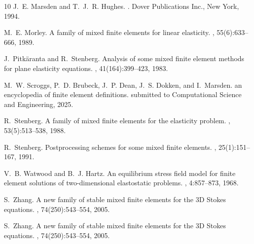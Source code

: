 \documentclass[12pt]{amsart}
\numberwithin{equation}{section}
\theoremstyle{definition}
\theoremstyle{remark}
\renewcommand{\(}{\bigl(}
\renewcommand{\)}{\bigr)}
\begin{document}
\begin{thebibliography}{10}
J.~E. Marsden and T.~J.~R. Hughes.
.
\newblock Dover Publications Inc., New York, 1994.

M.~E. Morley.
\newblock A family of mixed finite elements for linear elasticity.
, 55(6):633--666, 1989.

J.~Pitk{\"a}ranta and R.~Stenberg.
\newblock Analysis of some mixed finite element methods for plane elasticity
  equations.
, 41(164):399--423, 1983.

M.~W. Scroggs, P.~D. Brubeck, J.~P. Dean, J.~S. Dokken, and I.~Marsden.
 an encyclopedia of finite element definitions.
\newblock submitted to Computational Science and Engineering, 2025.

R.~Stenberg.
\newblock A family of mixed finite elements for the elasticity problem.
, 53(5):513--538, 1988.

R.~Stenberg.
\newblock Postprocessing schemes for some mixed finite elements.
, 25(1):151--167, 1991.

V.~B. Watwood and B.~J. Hartz.
\newblock An equilibrium stress field model for finite element solutions of
  two-dimensional elastostatic problems.
, 4:857--873,
  1968.

S.~Zhang.
\newblock A new family of stable mixed finite elements for the 3{D} {S}tokes
  equations.
, 74(250):543--554, 2005.

S.~Zhang.
\newblock A new family of stable mixed finite elements for the 3{D} {S}tokes
  equations.
, 74(250):543--554, 2005.

\end{thebibliography}
\end{document}
